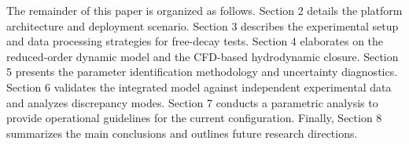 The remainder of this paper is organized as follows. Section 2 details the platform architecture and deployment scenario. Section 3 describes the experimental setup and data processing strategies for free-decay tests. Section 4 elaborates on the reduced-order dynamic model and the CFD-based hydrodynamic closure. Section 5 presents the parameter identification methodology and uncertainty diagnostics. Section 6 validates the integrated model against independent experimental data and analyzes discrepancy modes. Section 7 conducts a parametric analysis to provide operational guidelines for the current configuration. Finally, Section 8 summarizes the main conclusions and outlines future research directions.
